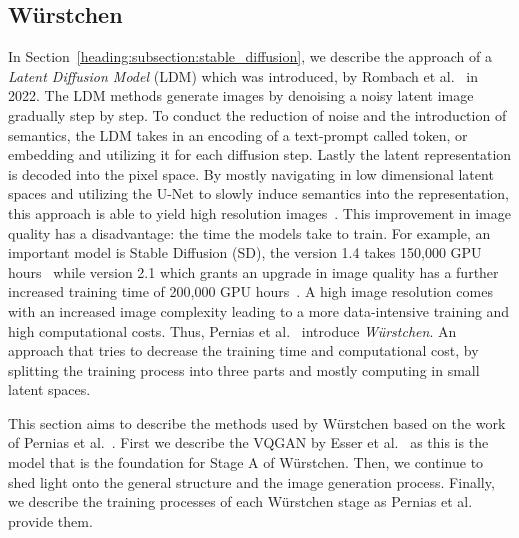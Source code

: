 \subsection{W\"urstchen}
In Section~\ref{heading:subsection:stable_diffusion}, we describe the approach
of a \emph{Latent Diffusion Model} (LDM) which was introduced,
by Rombach et al.~\cite{rombach2022stablediffusion} in 2022. The LDM methods
generate images by denoising a noisy latent image gradually step by step. To
conduct the reduction of noise and the introduction of semantics, the LDM takes
in an encoding of a text-prompt called token, or embedding and utilizing it for
each diffusion step. Lastly the latent representation is decoded into the
pixel space. By mostly navigating in low dimensional latent spaces and
utilizing the U-Net to slowly induce semantics into the representation, this
approach is able to yield high resolution images~\cite{rombach2022stablediffusion}.
This improvement in image quality has a disadvantage: the time the models take
to train. For example, an important model is Stable Diffusion (SD), the version
1.4 takes 150,000 GPU hours~\cite{rombach2022sd_1_4} while version 2.1 which
grants an upgrade in image quality has a further increased training time of
200,000 GPU hours~\cite{rombach2023sd_2_1}. A high image resolution comes with
an increased image complexity leading to a more data-intensive training and
high computational costs. Thus, Pernias et al.~\cite{pernias2024wrstchen}
introduce \emph{W\"urstchen}. An approach that tries to decrease the training
time and computational cost, by splitting the training process into three parts
and mostly computing in small latent spaces.

This section aims to describe the methods used by W\"urstchen based on the work
of Pernias et al.~\cite{pernias2024wrstchen}. First we describe the VQGAN by
Esser et al.~\cite{esser2021tamingtransformershighresolutionimage} as this is
the model that is the foundation for Stage A of W\"urstchen. Then, we continue
to shed light onto the general structure and the image generation process. Finally, we
describe the training processes of each W\"urstchen stage as Pernias et al.
provide them.
